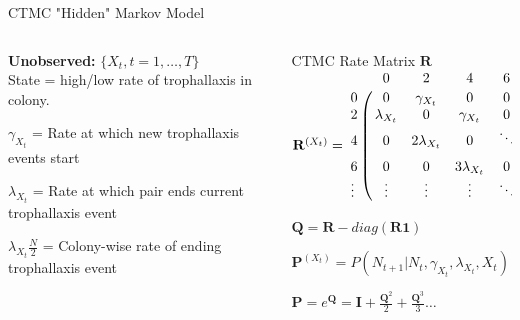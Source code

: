 \documentclass[10pt]{beamer}
\begin{document}
\begin{frame}[fragile]{CTMC "Hidden" Markov Model}
 \begin{columns}[T]
 \begin{column}{.4\textwidth}
    \begin{block}{}
\textbf{Unobserved:} $\{X_t, t = 1, \dots, T\}$ \\ 
State = high/low rate of trophallaxis in colony.


$\gamma_{X_t} $ = Rate at which new trophallaxis events start

$\lambda_{X_t} $ = Rate at which pair ends current trophallaxis event

$ \lambda_{X_t} \frac{N}{2}$ = Colony-wise rate of ending trophallaxis event

\end{block}
    \end{column}

 \begin{column}{.6\textwidth}
    \begin{block}{}
    CTMC Rate Matrix $\mathbf{R}$\\
    
$\mathbf{R}^{(X_t)} = \bordermatrix{
   & 0 & 2 & 4 & 6 & \dots \cr
 0 & 0 & \gamma_{X_t} & 0 & 0 & \dots \cr
 2 & \lambda_{X_t} & 0  & \gamma_{X_t} & 0 & \dots \cr
 4 & 0 & 2\lambda_{X_t} & 0  & \ddots & \dots \cr
 6 & 0 & 0 & 3 \lambda_{X_t} & 0  & \ddots \cr
 \vdots & \vdots & \vdots & \vdots & \ddots & \dots}$
 
 $\mathbf{Q} = \mathbf{R} - diag(\mathbf{R1})$

$\mathbf{P}^{(X_t)} = P(N_{t+1}|N_t, \gamma_{X_t}, \lambda_{X_t}, X_t ) = e^{\mathbf{Q}^{(X_t)} * \Delta t} $

$\mathbf{P} = e^{\bm{Q}} = \bm{I} + \frac{\bm{Q}^2}{2} + \frac{\bm{Q}^3}{3} \dots $

\end{block}
    \end{column}
  \end{columns}

\end{frame}
\end{document}
